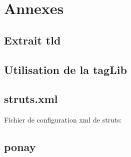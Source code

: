 \section{Annexes}


\subsection*{Extrait tld}

\subsection*{Utilisation de la tagLib}


\subsection*{struts.xml}

Fichier de configuration xml de struts:


\subsection*{ponay}
